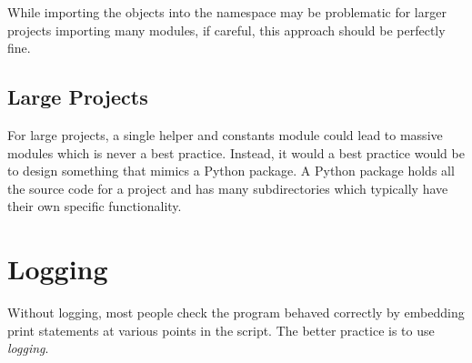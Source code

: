 \documentclass{article}%
\begin{document}
While importing the objects into the namespace may be problematic for larger projects importing many modules, if careful, this approach should be perfectly fine.  

\subsection{Large Projects}
For large projects, a single helper and constants module could lead to massive modules which is never a best practice. Instead, it would a best practice would be to design something that mimics a
Python package. A Python package holds all the source code for a project and has many subdirectories which typically have their own specific functionality.



\section{Logging}
Without logging, most people check the program behaved correctly by embedding print statements at various points in the script. The better practice is to use \textit{logging}. \\
\end{document}
